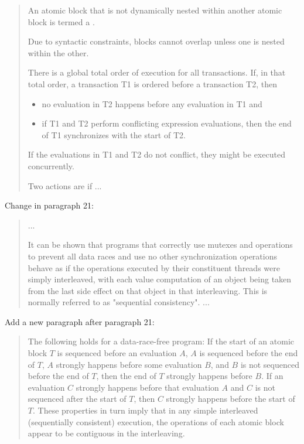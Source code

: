 \begin{quote}
\pnum
\setcounter{Paras}{20}
\setcounter{note}{20}
An atomic block that is not dynamically nested within another atomic
block is termed a .
\begin{note}
Due to syntactic constraints,
blocks cannot overlap unless one is nested within the other.
\end{note}
There is a global total order of execution for all transactions.
If, in that total order, a transaction T1 is ordered before a transaction T2,
then

\begin{itemize}
\item
  no evaluation in T2 happens before any evaluation in T1 and
\item
  if T1 and T2 perform conflicting expression evaluations, then the end
  of T1 synchronizes with the start of T2.
\end{itemize}

\begin{note}
If the evaluations in T1 and T2 do not conflict, they might be
executed concurrently.
\end{note}

\pnum
Two actions are  if ...
\end{quote}

Change in  paragraph 21:

\begin{quote}
\setcounter{Paras}{20}
\setcounter{note}{20}
\pnum
...
\begin{note}
It can be shown that programs that correctly use
mutexes and 
operations to prevent all data races and use no other synchronization
operations behave as if the operations executed by their constituent
threads were simply interleaved, with each value computation of an
object being taken from the last side effect on that object in that
interleaving. This is normally referred to as "sequential consistency".
...
\end{note}
\end{quote}

Add a new paragraph after  paragraph 21:

\begin{quote}
\setcounter{Paras}{21}
\pnum
\begin{note}
The following holds for a data-race-free program: If the start
of an atomic block $T$ is sequenced before an evaluation $A$, $A$ is sequenced
before the end of $T$, $A$ strongly happens before some evaluation $B$, and $B$
is not sequenced before the end of $T$, then the end of $T$ strongly happens
before $B$. If an evaluation $C$ strongly happens before that evaluation $A$
and $C$ is not sequenced after the start of $T$, then $C$ strongly happens
before the start of $T$. These properties in turn imply that in any simple
interleaved (sequentially consistent) execution, the operations of each
atomic block appear to be contiguous in the interleaving.
\end{note}
\end{quote}

